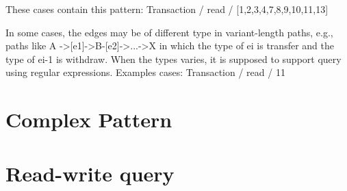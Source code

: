 These cases contain this pattern: Transaction / read / [1,2,3,4,7,8,9,10,11,13]



In some cases, the edges may be of different type in variant-length paths, e.g.,
paths like A ->[e1]->B-[e2]->...->X in  which the type of ei  is transfer and
the type of ei-1  is withdraw. When the types varies, it is supposed to support
query using regular expressions. Examples cases: Transaction / read / 11


\section{Complex Pattern}






\section{Read-write query}




